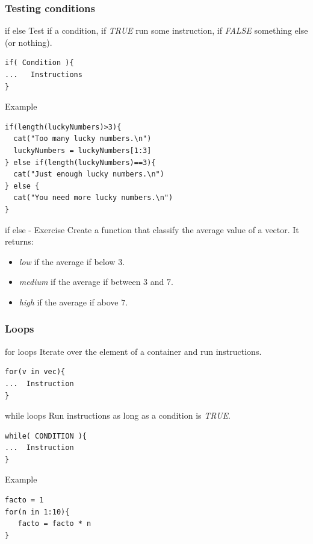 \documentclass[10pt]{beamer}
\newenvironment{xframe}[2][]
  {\begin{frame}[fragile,environment=xframe,#1]
  \frametitle{#2}}
  {\end{frame}}
\begin{document}
\begin{xframe}{Testing conditions}
  \begin{block}{{\sf if else}}
    Test if a condition, if {\it TRUE} run some instruction, if {\it FALSE} something else (or nothing).
\begin{verbatim}
if( Condition ){
...   Instructions
} 
\end{verbatim}  
  \end{block}
  \begin{exampleblock}{Example}
\begin{verbatim}
if(length(luckyNumbers)>3){
  cat("Too many lucky numbers.\n")
  luckyNumbers = luckyNumbers[1:3]
} else if(length(luckyNumbers)==3){
  cat("Just enough lucky numbers.\n")
} else {
  cat("You need more lucky numbers.\n")
}
\end{verbatim}  
  \end{exampleblock}
\end{xframe}


\begin{frame}{{\sf if else} - Exercise}
  Create a function that classify the average value of a {\sf vector}. It returns:
  \begin{itemize}
  \item {\it low} if the average if below $3$.
  \item {\it medium} if the average if between $3$ and $7$.
  \item {\it high} if the average if above $7$.
  \end{itemize}
\end{frame}



\begin{xframe}{Loops}
  \begin{block}{{\sf for} loops}
    Iterate over the element of a container and run instructions.
\begin{verbatim}
for(v in vec){
...  Instruction
}
\end{verbatim}  
  \end{block}
  \begin{block}{{\sf while} loops}
    Run instructions as long as a condition is {\it TRUE}.
\begin{verbatim}
while( CONDITION ){
...  Instruction
}
\end{verbatim}  
  \end{block}
  \begin{exampleblock}{Example}
\begin{verbatim}
facto = 1
for(n in 1:10){
   facto = facto * n
}
\end{verbatim}  
  \end{exampleblock}
\end{xframe}
\end{document}
